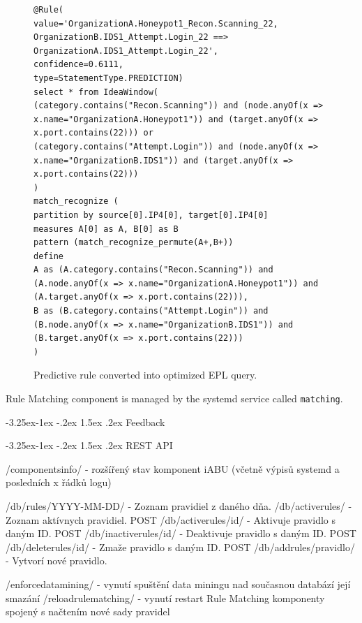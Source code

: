 \documentclass[a4paper]{article} %
\makeatletter
\renewcommand\subsection{\@startsection{subsection}{2}{\z@}%
                   {-3.25ex\@plus -1ex \@minus -.2ex}%
                   {1.5ex \@plus .2ex}%
                   {\normalfont\sffamily\large\bfseries\color{projectcolor}}}
\makeatother
\begin{document}
\begin{figure}[h!]
\begin{lstlisting}[]
@Rule(
value='OrganizationA.Honeypot1_Recon.Scanning_22, OrganizationB.IDS1_Attempt.Login_22 ==> OrganizationA.IDS1_Attempt.Login_22',
confidence=0.6111,
type=StatementType.PREDICTION)
select * from IdeaWindow(
(category.contains("Recon.Scanning")) and (node.anyOf(x => x.name="OrganizationA.Honeypot1")) and (target.anyOf(x => x.port.contains(22))) or
(category.contains("Attempt.Login")) and (node.anyOf(x => x.name="OrganizationB.IDS1")) and (target.anyOf(x => x.port.contains(22)))
)
match_recognize (
partition by source[0].IP4[0], target[0].IP4[0]
measures A[0] as A, B[0] as B
pattern (match_recognize_permute(A+,B+))
define
A as (A.category.contains("Recon.Scanning")) and (A.node.anyOf(x => x.name="OrganizationA.Honeypot1")) and (A.target.anyOf(x => x.port.contains(22))),
B as (B.category.contains("Attempt.Login")) and (B.node.anyOf(x => x.name="OrganizationB.IDS1")) and (B.target.anyOf(x => x.port.contains(22)))
)
\end{lstlisting}
\caption{Predictive rule converted into optimized EPL query.}
\label{fig:query}
\end{figure}

Rule Matching component is managed by the systemd service called \texttt{matching}.


\subsection{Feedback}

\subsection{REST API}

    /componentsinfo/ - rozšířený stav komponent iABU (včetně výpisů systemd a posledních x řádků logu)

    /db/rules/YYYY-MM-DD/ - Zoznam pravidiel z daného dňa.
    /db/activerules/ - Zoznam aktívnych pravidiel.
    POST /db/activerules/id/ - Aktivuje pravidlo s daným ID.
    POST /db/inactiverules/id/ - Deaktivuje pravidlo s daným ID.
    POST /db/deleterules/id/ - Zmaže pravidlo s daným ID.
    POST /db/addrules/pravidlo/ - Vytvorí nové pravidlo.

    /enforcedatamining/ - vynutí spuštění data miningu nad současnou databází její smazání
    /reloadrulematching/ - vynutí restart Rule Matching komponenty spojený s načtením nové sady pravidel
\end{document}

